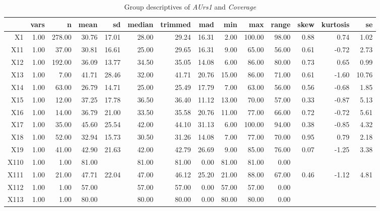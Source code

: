 \begin{table}[ht]
	\small
	\centering
	\begin{tabular}{rrrrrrrrrrrrrr}
		\hline
	   & vars & n & mean & sd & median & trimmed & mad & min & max & range & skew & kurtosis & se \\ 
		\hline
	  X1 & 1.00 & 278.00 & 30.76 & 17.01 & 28.00 & 29.24 & 16.31 & 2.00 & 100.00 & 98.00 & 0.88 & 0.74 & 1.02 \\ 
		X11 & 1.00 & 37.00 & 30.81 & 16.61 & 25.00 & 29.65 & 16.31 & 9.00 & 65.00 & 56.00 & 0.61 & -0.72 & 2.73 \\ 
		X12 & 1.00 & 192.00 & 36.09 & 13.77 & 34.50 & 35.05 & 14.08 & 6.00 & 86.00 & 80.00 & 0.73 & 0.65 & 0.99 \\ 
		X13 & 1.00 & 7.00 & 41.71 & 28.46 & 32.00 & 41.71 & 20.76 & 15.00 & 86.00 & 71.00 & 0.61 & -1.60 & 10.76 \\ 
		X14 & 1.00 & 63.00 & 26.79 & 14.71 & 25.00 & 25.49 & 17.79 & 7.00 & 63.00 & 56.00 & 0.56 & -0.68 & 1.85 \\ 
		X15 & 1.00 & 12.00 & 37.25 & 17.78 & 36.50 & 36.40 & 11.12 & 13.00 & 70.00 & 57.00 & 0.33 & -0.87 & 5.13 \\ 
		X16 & 1.00 & 14.00 & 36.79 & 21.00 & 33.50 & 35.58 & 20.76 & 11.00 & 77.00 & 66.00 & 0.72 & -0.72 & 5.61 \\ 
		X17 & 1.00 & 35.00 & 45.60 & 25.54 & 42.00 & 44.10 & 31.13 & 6.00 & 100.00 & 94.00 & 0.38 & -0.85 & 4.32 \\ 
		X18 & 1.00 & 52.00 & 32.94 & 15.73 & 30.50 & 31.26 & 14.08 & 7.00 & 77.00 & 70.00 & 0.95 & 0.79 & 2.18 \\ 
		X19 & 1.00 & 41.00 & 42.90 & 21.63 & 42.00 & 42.79 & 26.69 & 9.00 & 85.00 & 76.00 & 0.07 & -1.25 & 3.38 \\ 
		X110 & 1.00 & 1.00 & 81.00 &  & 81.00 & 81.00 & 0.00 & 81.00 & 81.00 & 0.00 &  &  &  \\ 
		X111 & 1.00 & 21.00 & 47.71 & 22.04 & 47.00 & 46.12 & 25.20 & 21.00 & 88.00 & 67.00 & 0.46 & -1.12 & 4.81 \\ 
		X112 & 1.00 & 1.00 & 57.00 &  & 57.00 & 57.00 & 0.00 & 57.00 & 57.00 & 0.00 &  &  &  \\ 
		X113 & 1.00 & 1.00 & 80.00 &  & 80.00 & 80.00 & 0.00 & 80.00 & 80.00 & 0.00 &  &  &  \\ 
		 \hline
	  \end{tabular}
    \caption{Group descriptives of \textit{AUrs1} and \textit{Coverage}}
    \label{tbl:descriptives_baysis_effector_AUrs1_Cov}
\end{table}

